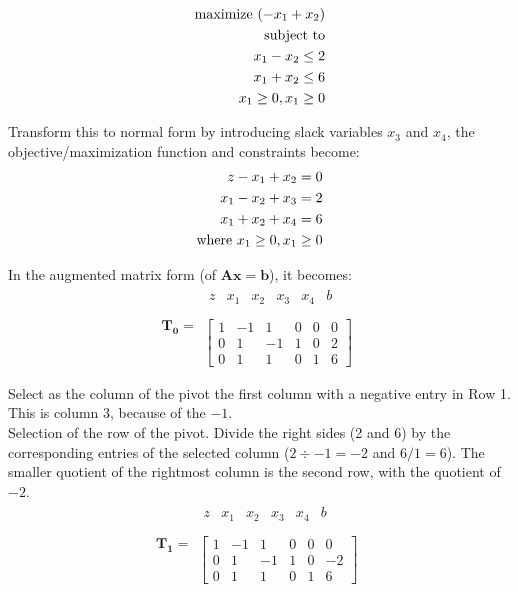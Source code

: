 \documentclass[letter,12pt]{article}
\begin{document}
\begin{eqnarray*}
{\rm maximize}\ (-x_{1} + x_{2}) \\
{\rm subject\ to} \\
x_{1} - x_{2} \leq 2 \\
x_{1} + x_{2} \leq 6 \\
x_{1} \geq 0, x_{1} \geq 0 \\
\end{eqnarray*}

Transform this to normal form by introducing slack variables $x_{3}$ and $x_{4}$, the objective/maximization function and constraints become: \\
\begin{eqnarray*}
z - x_{1} + x_{2} = 0 \\
x_{1} - x_{2} + x_{3} = 2 \\
x_{1} + x_{2} + x_{4 } = 6 \\
{\rm where}\ x_{1} \geq 0, x_{1} \geq 0 \\
\end{eqnarray*}


In the augmented matrix form (of $\mathbf{Ax = b}$), it becomes:
\[  \mathbf{T_{0}} =  
\begin{array}{c}
	\begin{array}{cccccc}
	z & x_{1} & x_{2} & x_{3} & x_{4} & b \\
	\end{array}
	\\
	\left[ \begin{array}{cccccc}
	1 & -1 & 1 & 0 & 0 & 0 \\
	0 & 1 & -1 & 1 & 0 & 2  \\
	0 & 1 & 1 & 0 & 1 & 6
	\end{array} \right]
\end{array}
\]

Select as the column of the pivot the first column with a negative entry in Row 1. This is column 3, because of the $-1$.\\

Selection of the row of the pivot. Divide the right sides (2 and 6) by the corresponding entries of the selected column ($2 \div -1 = -2$ and $6/1 = 6$). The smaller quotient of the rightmost column is the second row, with the quotient of $-2$.\\

\begin{equation*}
\mathbf{T_{1}} =  
\begin{array}{c}
	\begin{array}{cccccc}
	z & x_{1} & x_{2} & x_{3} & x_{4} & b \\
	\end{array}
	\\
	\left[ \begin{array}{cccccc}
	1 & -1 & 1 & 0 & 0 & 0 \\
	0 & 1 & -1 & 1 & 0 & -2  \\
	0 & 1 & 1 & 0 & 1 & 6
	\end{array} \right]
\end{array}
\end{equation*}
\end{document}
